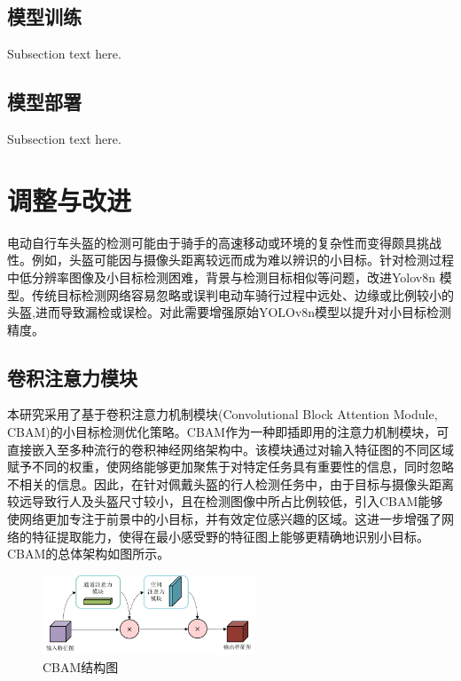 \documentclass[journal]{IEEEtran}
\begin{document}
\subsection{模型训练}
Subsection text here.

\subsection{模型部署}
Subsection text here.

\section{调整与改进}
电动自行车头盔的检测可能由于骑手的高速移动或环境的复杂性而变得颇具挑战性。例如，头盔可能因与摄像头距离较远而成为难以辨识的小目标。针对检测过程中低分辨率图像及小目标检测困难，背景与检测目标相似等问题，改进Yolov8n 模型。传统目标检测网络容易忽略或误判电动车骑行过程中远处、边缘或比例较小的头盔,进而导致漏检或误检。对此需要增强原始YOLOv8n模型以提升对小目标检测精度。
\subsection{卷积注意力模块}
本研究采用了基于卷积注意力机制模块\cite{ref1}(Convolutional Block Attention Module, CBAM)的小目标检测优化策略。CBAM作为一种即插即用的注意力机制模块，可直接嵌入至多种流行的卷积神经网络架构中。该模块通过对输入特征图的不同区域赋予不同的权重，使网络能够更加聚焦于对特定任务具有重要性的信息，同时忽略不相关的信息。因此，在针对佩戴头盔的行人检测任务中，由于目标与摄像头距离较远导致行人及头盔尺寸较小，且在检测图像中所占比例较低，引入CBAM能够使网络更加专注于前景中的小目标，并有效定位感兴趣的区域。这进一步增强了网络的特征提取能力，使得在最小感受野的特征图上能够更精确地识别小目标。CBAM的总体架构如图所示。

\begin{figure}
  \centering
  \includegraphics[width=2.5in]{./picture/CBAM结构图.png}
  \caption{CBAM结构图}
  \label{fig:CBAM}
\end{figure}
\end{document}
